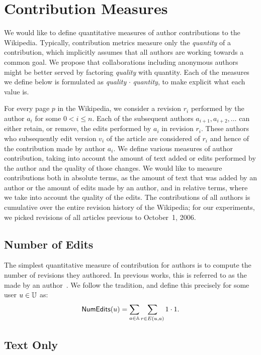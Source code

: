 \section{Contribution Measures}

We would like to define quantitative measures of author 
contributions to the Wikipedia.
Typically, contribution metrics measure only the
\textit{quantity} of a contribution,
which implicitly assumes that all authors
are working towards a common goal.
We propose that collaborations including anonymous
authors might be better served by factoring
\textit{quality} with quantity.
Each of the measures we define below
is formulated as
\textit{quality} $\cdot$ \textit{quantity},
to make explicit what each value is.

For every page $p$ in the Wikipedia, we consider a revision $r_i$ 
performed by the author $a_i$ for some $0 < i \le n$.
Each of the subsequent authors $a_{i+1},a_{i+2},\ldots$ can either
retain, or remove, the edits performed by $a_i$ in revision
$r_i$.
These authors who subsequently edit version $v_i$ of the article
are considered  of $r_i$ and hence of the 
contribution made by author $a_i$.
We define various measures of author contribution, taking into
account the amount of text added or edits performed by the author
and the quality of those changes.
We would like to measure contributions both in absolute terms,
as the amount of text that was added by an author or the
amount of edits made by an author, and in relative terms, 
where we take into account the quality of the edits.
The contributions of all authors is cumulative over the 
entire revision history of the Wikipedia;
for our experiments, we picked revisions of all articles
previous to October~1, 2006.

\subsection{Number of Edits}

\noindent
The simplest quantitative measure of contribution for 
authors is to compute the number of revisions they authored.
In previous works, this is referred to as the 
 made by an 
author~\cite{Wales2005,EditsEqQuality2007,Bourgeoisie2007,SteinHess2007}.
We follow the tradition, and define this precisely
for some user $u \in \mathbb{U}$ as:
%
\[
\mathsf{NumEdits}(u) = \sum_{a \in \mathbb{A}} \sum_{r \in E(u, a)} 1 \cdot 1.
\]
%

\subsection{Text Only}

